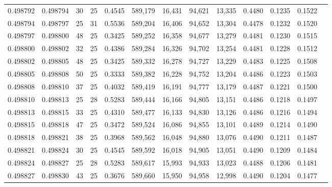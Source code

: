 \begin{tabular}{rrrrrrrrrrrrr}
0.498792 & 0.498794 &    30 &  25 &                                     0.4545 & 589,179 &  16,431 &  94,621 &  13,335 & 0.4480 & 0.1235 & 0.1522 \\
0.498794 & 0.498797 &    25 &  31 &                                     0.5536 & 589,204 &  16,406 &  94,652 &  13,304 & 0.4478 & 0.1232 & 0.1520 \\
0.498797 & 0.498800 &    48 &  25 &                                     0.3425 & 589,252 &  16,358 &  94,677 &  13,279 & 0.4481 & 0.1230 & 0.1515 \\
0.498800 & 0.498802 &    32 &  25 &                                     0.4386 & 589,284 &  16,326 &  94,702 &  13,254 & 0.4481 & 0.1228 & 0.1512 \\
0.498802 & 0.498805 &    48 &  25 &                                     0.3425 & 589,332 &  16,278 &  94,727 &  13,229 & 0.4483 & 0.1225 & 0.1508 \\
0.498805 & 0.498808 &    50 &  25 &                                     0.3333 & 589,382 &  16,228 &  94,752 &  13,204 & 0.4486 & 0.1223 & 0.1503 \\
0.498808 & 0.498810 &    37 &  25 &                                     0.4032 & 589,419 &  16,191 &  94,777 &  13,179 & 0.4487 & 0.1221 & 0.1500 \\
0.498810 & 0.498813 &    25 &  28 &                                     0.5283 & 589,444 &  16,166 &  94,805 &  13,151 & 0.4486 & 0.1218 & 0.1497 \\
0.498813 & 0.498815 &    33 &  25 &                                     0.4310 & 589,477 &  16,133 &  94,830 &  13,126 & 0.4486 & 0.1216 & 0.1494 \\
0.498815 & 0.498818 &    47 &  25 &                                     0.3472 & 589,524 &  16,086 &  94,855 &  13,101 & 0.4489 & 0.1214 & 0.1490 \\
0.498818 & 0.498821 &    38 &  25 &                                     0.3968 & 589,562 &  16,048 &  94,880 &  13,076 & 0.4490 & 0.1211 & 0.1487 \\
0.498821 & 0.498824 &    30 &  25 &                                     0.4545 & 589,592 &  16,018 &  94,905 &  13,051 & 0.4490 & 0.1209 & 0.1484 \\
0.498824 & 0.498827 &    25 &  28 &                                     0.5283 & 589,617 &  15,993 &  94,933 &  13,023 & 0.4488 & 0.1206 & 0.1481 \\
0.498827 & 0.498830 &    43 &  25 &                                     0.3676 & 589,660 &  15,950 &  94,958 &  12,998 & 0.4490 & 0.1204 & 0.1477 \\

\end{tabular}

